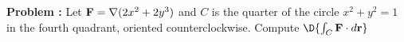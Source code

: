 {\bf Problem :}  Let \({\bf F}=\nabla (2x^{2}+2y^{3})\) and  \(C\) is the quarter of the circle \(x^2+y^2 = 1\) in the fourth quadrant, oriented counterclockwise. Compute \(\D{\int_C {\bf F}\cdot d{\bf r} }\)
